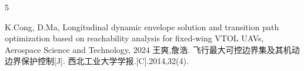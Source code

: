 \documentclass[11pt]{ctexrep}
\begin{document}
\begin{thebibliography}{5}  

K.Cong, D.Ma, Longitudinal dynamic envelope solution and transition path optimization based on reachability analysis for fixed-wing VTOL UAVs, Aerospace Science and Technology, 2024
王爽,詹浩. 飞行最大可控边界集及其机动边界保护控制[J]. 西北工业大学学报.[C].2014,32(4).

\end{thebibliography}
\end{document}
